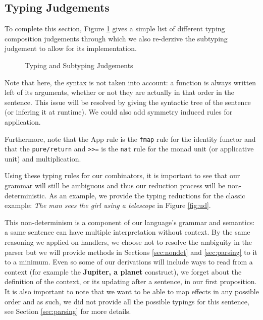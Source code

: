 \subsection{Typing Judgements}\label{subsec:judgements}
To complete this section, Figure \ref{tab:judgements} gives a simple list of different typing composition judgements through which we also re-derzive the subtyping judgement to allow for its implementation.
\begin{figure}
	\caption{Typing and Subtyping Judgements}
	\label{tab:judgements}
\end{figure}
Note that here, the syntax is not taken into account: a function is always written left of its arguments, whether or not they are actually in that order in the sentence.
This issue will be resolved by giving the syntactic tree of the sentence (or infering it at runtime).
We could also add symmetry induced rules for application.

Furthermore, note that the App rule is the \texttt{fmap} rule for the identity functor and that the \texttt{pure/return} and \texttt{>>=} is the \texttt{nat} rule for the monad unit (or applicative unit) and multiplication.

\medskip

Using these typing rules for our combinators, it is important to see that our grammar will still be ambiguous and thus our reduction process will be non-deterministic.
As an example, we provide the typing reductions for the classic example: \textsl{The man sees the girl using a telescope} in Figure \ref{fig:ud}.

\begin{figure*}
	\centering
	\caption{Parsing trees for the typing of \textsl{The man sees the girl using a telescope}.}
	\label{fig:ud}
\end{figure*}

This non-determinism is a component of our language's grammar and semantics:
a same sentence can have multiple interpretation without context.
By the same reasoning we applied on handlers, we choose not to resolve the
ambiguity in the parser but we will provide methods in Sections
\ref{sec:nondet} and \ref{sec:parsing} to it to a minimum.
Even so some of our derivations will include ways to read from a context (for
example the \textbf{Jupiter, a planet} construct), we forget about the
definition of the context, or its updating after a sentence, in our first
proposition.
It is also important to note that we want to be able to map effects in any
possible order and as such, we did not provide all the possible typings for
this sentence, see Section \ref{sec:parsing} for more details.

